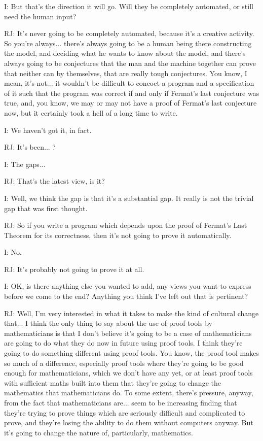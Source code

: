 \documentclass[10pt,titlepage]{book}
\begin{document}
I: But that's the direction it will go. Will they be completely automated, or still need the human input?

RJ: It's never going to be completely automated, because it's a creative activity. So you're always... there's always going to be a human being there constructing the model, and deciding what he wants to know about the model, and there's always going to be conjectures that the man and the machine together can prove that neither can by themselves, that are really tough conjectures. You know, I mean, it's not... it wouldn't be difficult to concoct a program and a specification of it such that the program was correct if and only if Fermat's last conjecture was true, and, you know, we may or may not have a proof of Fermat's last conjecture now, but it certainly took a hell of a long time to write.

I: We haven't got it, in fact.

RJ: It's been... ?

I: The gaps...

RJ: That's the latest view, is it?

I: Well, we think the gap is that it's a substantial gap. It really is not the trivial gap that was first thought.

RJ: So if you write a program which depends upon the proof of Fermat's Last Theorem for its correctness, then it's not going to prove it automatically.

I: No.

RJ: It's probably not going to prove it at all.

I: OK, is there anything else you wanted to add, any views you want to express before we come to the end? Anything you think I've left out that is pertinent?

RJ: Well, I'm very interested in what it takes to make the kind of cultural change that... I think the only thing to say about the use of proof tools by mathematicians is that I don't believe it's going to be a case of mathematicians are going to do what they do now in future using proof tools. I think they're going to do something different using proof tools. You know, the proof tool makes so much of a difference, especially proof tools where they're going to be good enough for mathematicians, which we don't have any yet, or at least proof tools with sufficient maths built into them	that they're going to change the mathematics that mathematicians do. To some extent, there's pressure, anyway, from the fact that mathematicians are... seem to be increasing finding that they're trying to prove things which are seriously difficult and complicated to prove, and they're losing the ability to do them without computers anyway. But it's going to change the nature of, particularly, mathematics.
\end{document}
